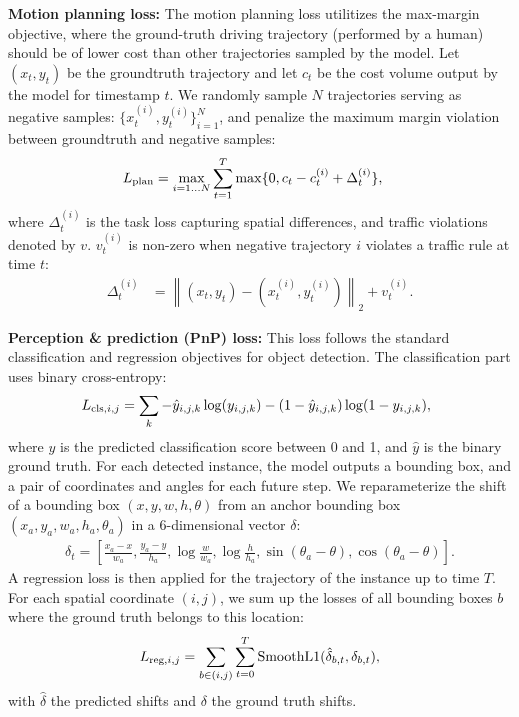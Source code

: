\textbf{Motion planning loss:} The motion planning loss utilitizes the max-margin objective, where
the ground-truth driving trajectory (performed by a human) should be of lower cost than other
trajectories sampled by the model. Let $(x_t, y_t)$ be the groundtruth trajectory and let $c_t$ be
the cost volume output by the model for timestamp $t$. We randomly sample $N$ trajectories serving as negative samples: $\{x_t^{(i)}, y_t^{(i)}\}_{i=1}^N$, and  penalize the maximum margin violation between groundtruth and negative samples:
\begin{align}
L_{\text{plan}} &= \max_{i=1 \dots N} \sum_{t=1}^{T} \max\{ 0, c_t - c^{(i)}_t + \Delta_t^{(i)} \},
\end{align}
where $\Delta^{(i)}_t$ is the task loss capturing spatial differences, and traffic violations denoted by $v$. $v^{(i)}_t$ is non-zero when negative trajectory $i$ violates a traffic rule at time $t$:
\begin{align}
\Delta^{(i)}_t &= \left \lVert (x_t, y_t) - (x^{(i)}_t, y^{(i)}_t) \right \rVert_2 + v^{(i)}_t.
\end{align}

\textbf{Perception \& prediction (PnP) loss:} This loss follows the
standard classification and regression objectives for object detection. The classification part uses binary cross-entropy:
\begin{align}
\hspace{-0.07in}
\cLclaij = \sum_k -\hat{y}_{i,j,k} \log(y_{i,j,k}) - (1- \hat{y}_{i,j,k}) \log (1 - y_{i,j,k}),
\end{align}
where $y$ is the predicted classification score between 0 and 1, and $\hat{y}$ is the binary
ground truth. For each detected instance, the model outputs a bounding box, and a pair of coordinates
and angles for each future step. We reparameterize the shift of a bounding box $(x, y, w, h, \theta)$ from
an anchor bounding box $(x_a, y_a, w_a, h_a, \theta_a)$ in a 6-dimensional vector $\delta$:
\begin{align}
\delta_t = 
[
\frac{x_a - x}{w_a},
\frac{y_a - y}{h_a},
\log \frac{w}{w_a},
\log \frac{h}{h_a},
\sin (\theta_a - \theta),
\cos (\theta_a - \theta)
].
\end{align}
A regression loss is then applied for the trajectory of the instance up to time $T$. For each
spatial coordinate $(i,j)$, we sum up the losses of all bounding boxes $b$ where the ground truth belongs to this location:
\begin{align}
L_{\text{reg},i,j} = \sum_{b \in (i, j)} \sum_{t=0}^{T} \mathrm{SmoothL1}(\hat{\delta}_{b,t}, \delta_{b,t}),
\end{align}
with $\hat{\delta}$  the predicted shifts and $\delta$  the ground truth shifts.

